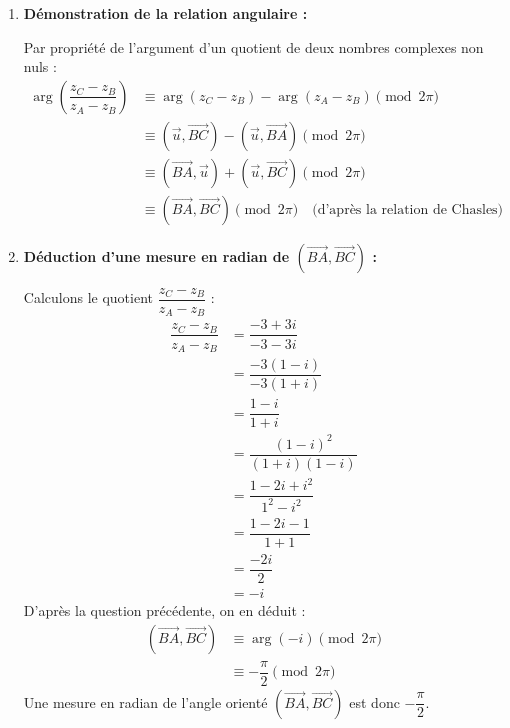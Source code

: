 \documentclass[12pt,a4paper]{article}
\begin{document}
\begin{enumerate}
\begin{enumerate}
        \item \textbf{Démonstration de la relation angulaire :}
        
        Par propriété de l'argument d'un quotient de deux nombres complexes non nuls :
        $$
        \begin{aligned}
            \arg\left( \dfrac{z_C - z_B}{z_A - z_B} \right) &\equiv \arg(z_C - z_B) - \arg(z_A - z_B) \pmod{2\pi} \\
            &\equiv \left(\vec{u}, \overrightarrow{BC}\right) - \left(\vec{u}, \overrightarrow{BA}\right) \pmod{2\pi} \\
            &\equiv \left(\overrightarrow{BA}, \vec{u}\right) + \left(\vec{u}, \overrightarrow{BC}\right) \pmod{2\pi} \\
            &\equiv \left(\overrightarrow{BA}, \overrightarrow{BC}\right) \pmod{2\pi} \quad \text{(d'après la relation de Chasles)}
        \end{aligned}
        $$

        \item \textbf{Déduction d'une mesure en radian de $\left(\overrightarrow{BA}, \overrightarrow{BC}\right)$ :}
        
        Calculons le quotient $\dfrac{z_C - z_B}{z_A - z_B}$ :
        $$
        \begin{aligned}
            \dfrac{z_C - z_B}{z_A - z_B} &= \dfrac{-3 + 3i}{-3 - 3i} \\
            &= \dfrac{-3(1 - i)}{-3(1 + i)} \\
            &= \dfrac{1 - i}{1 + i} \\
            &= \dfrac{(1 - i)^2}{(1 + i)(1 - i)} \\
            &= \dfrac{1 - 2i + i^2}{1^2 - i^2} \\
            &= \dfrac{1 - 2i - 1}{1 + 1} \\
            &= \dfrac{-2i}{2} \\
            &= -i
        \end{aligned}
        $$
        D'après la question précédente, on en déduit :
        $$
        \begin{aligned}
            \left(\overrightarrow{BA}, \overrightarrow{BC}\right) &\equiv \arg(-i) \pmod{2\pi} \\
            &\equiv -\dfrac{\pi}{2} \pmod{2\pi}
        \end{aligned}
        $$
        Une mesure en radian de l'angle orienté $\left(\overrightarrow{BA}, \overrightarrow{BC}\right)$ est donc $-\dfrac{\pi}{2}$.


\end{enumerate}
\end{enumerate}
\end{document}
